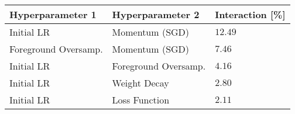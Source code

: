 \begin{tabular}{lll}
\toprule
Hyperparameter 1 & Hyperparameter 2 & Interaction [\%] \\
\midrule
Initial LR & Momentum (SGD) & $12.49$ \\
Foreground Oversamp. & Momentum (SGD) & $7.46$ \\
Initial LR & Foreground Oversamp. & $4.16$ \\
Initial LR & Weight Decay & $2.80$ \\
Initial LR & Loss Function & $2.11$ \\
\bottomrule
\end{tabular}
